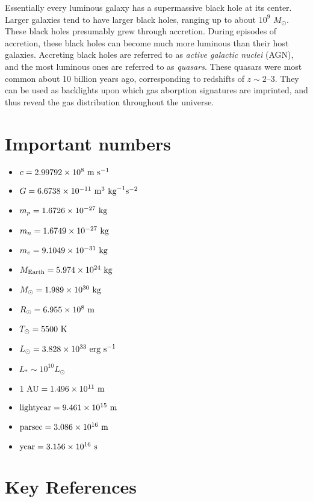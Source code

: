 Essentially every luminous galaxy has a supermassive black hole at its
center. Larger galaxies tend to have larger black holes, ranging up to
about $10^9$ $M_\odot$. These black holes presumably grew through
accretion. During episodes of accretion, these black holes can become
much more luminous than their host galaxies. Accreting black holes are
referred to as {\it active galactic nuclei} (AGN), and the most
luminous ones are referred to as {\it quasars}. These quasars were
most common about 10 billion years ago, corresponding to redshifts of
$z\sim 2$--$3$. They can be used as backlights upon which gas
aborption signatures are imprinted, and thus reveal the gas
distribution throughout the universe.

\section{Important numbers}

\begin{itemize}
\item $c = 2.99792 \times 10^8  {\rm ~m} {\rm ~s}^{-1} $
\item $G = 6.6738 \times 10^{-11} {\rm ~m}^3 {\rm ~kg}^{-1} {\rm s}^{-2} $
\item $m_p =  1.6726 \times 10^{-27} {\rm ~kg} $
\item $m_n =  1.6749 \times 10^{-27} {\rm ~kg} $
\item $m_e =  9.1049 \times 10^{-31} {\rm ~kg} $
\item $M_{\rm Earth} = 5.974 \times 10^{24} {\rm ~kg} $
\item $M_{\odot} = 1.989 \times 10^{30} {\rm ~kg} $
\item $R_{\odot} = 6.955 \times 10^{8} {\rm ~m} $
\item $T_{\odot} = 5500 {\rm ~K} $
\item $L_{\odot} = 3.828 \times 10^{33} {\rm ~erg} {\rm ~s}^{-1}$
\item $L_{\ast} \sim 10^{10} L_{\odot} $
\item ${\rm 1~AU} = 1.496 \times 10^{11} {\rm ~m} $
\item ${\rm lightyear} = 9.461 \times 10^{15} {\rm ~m} $
\item ${\rm parsec} = 3.086 \times 10^{16} {\rm ~m} $
\item ${\rm year} = 3.156 \times 10^{16} {\rm ~s} $
\end{itemize}

\section{Key References}

